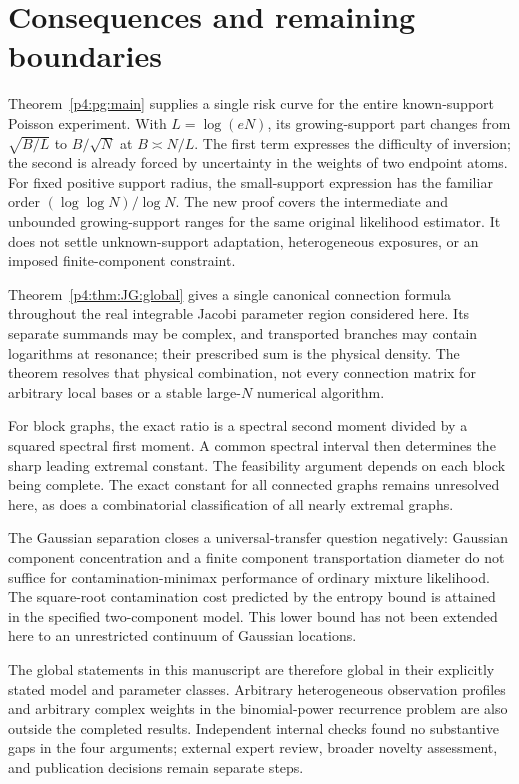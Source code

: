 \documentclass[11pt,a4paper]{article}
\theoremstyle{definition}
\theoremstyle{remark}
\numberwithin{equation}{section}
\begin{document}
\section{Consequences and remaining boundaries}

Theorem~\ref{p4:pg:main} supplies a single risk curve for the entire
known-support Poisson experiment. With $L=\log(eN)$, its growing-support
part changes from $\sqrt{B/L}$ to $B/\sqrt N$ at $B\asymp N/L$.
The first term expresses the difficulty of inversion; the second is
already forced by uncertainty in the weights of two endpoint atoms.
For fixed positive support radius, the small-support expression has the
familiar order $(\log\log N)/\log N$. The new proof covers the
intermediate and unbounded growing-support ranges for the same original
likelihood estimator. It does not settle unknown-support adaptation,
heterogeneous exposures, or an imposed finite-component constraint.

Theorem~\ref{p4:thm:JG:global} gives a single canonical connection formula
throughout the real integrable Jacobi parameter region considered here.
Its separate summands may be complex, and transported branches may contain
logarithms at resonance; their prescribed sum is the physical density.
The theorem resolves that physical combination, not every connection
matrix for arbitrary local bases or a stable large-$N$ numerical algorithm.

For block graphs, the exact ratio is a spectral second moment divided
by a squared spectral first moment. A common spectral interval then
determines the sharp leading extremal constant. The feasibility argument
depends on each block being complete. The exact constant for all connected
graphs remains unresolved here, as does a combinatorial classification
of all nearly extremal graphs.

The Gaussian separation closes a universal-transfer question negatively:
Gaussian component concentration and a finite component transportation
diameter do not suffice for contamination-minimax performance of ordinary
mixture likelihood. The square-root contamination cost predicted by the
entropy bound is attained in the specified two-component model. This
lower bound has not been extended here to an unrestricted continuum of
Gaussian locations.

The global statements in this manuscript are therefore global in their
explicitly stated model and parameter classes. Arbitrary heterogeneous
observation profiles and arbitrary complex weights in the binomial-power
recurrence problem are also outside the completed results. Independent
internal checks found no substantive gaps in the four arguments; external
expert review, broader novelty assessment, and publication decisions remain
separate steps.
\end{document}
